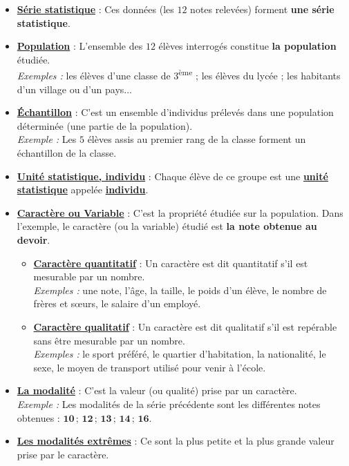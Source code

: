 \documentclass[11pt, a4paper]{article}
\begin{document}
\begin{itemize}
    \item \textbf{\underline{Série statistique}} : Ces données (les $12$ notes relevées) forment \textbf{une série statistique}.
    \item \textbf{\underline{Population}} : L'ensemble des $12$ élèves interrogés constitue \textbf{la population} étudiée. \\
    \textit{Exemples :} les élèves d'une classe de 3\textsuperscript{ème} ; les élèves du lycée ; les habitants d'un village ou d'un pays...
    \item \textbf{\underline{Échantillon}} : C'est un ensemble d'individus prélevés dans une population déterminée (une partie de la population). \\
    \textit{Exemple :} Les $5$ élèves assis au premier rang de la classe forment un échantillon de la classe.
    \item \textbf{\underline{Unité statistique, individu}} : Chaque élève de ce groupe est une \textbf{\underline{unité statistique}} appelée \textbf{\underline{individu}}.
    \item \textbf{\underline{Caractère ou Variable}} : C'est la propriété étudiée sur la population. Dans l'exemple, le caractère (ou la variable) étudié est \textbf{la note obtenue au devoir}.
    \begin{itemize}
        \item \textbf{\underline{Caractère quantitatif}} : Un caractère est dit quantitatif s'il est mesurable par un nombre. \\
        \textit{Exemples :} une note, l'âge, la taille, le poids d'un élève, le nombre de frères et sœurs, le salaire d'un employé.
        \item \textbf{\underline{Caractère qualitatif}} : Un caractère est dit qualitatif s'il est repérable sans être mesurable par un nombre. \\
        \textit{Exemples :} le sport préféré, le quartier d'habitation, la nationalité, le sexe, le moyen de transport utilisé pour venir à l'école.
    \end{itemize}
    \item \textbf{\underline{La modalité}} : C'est la valeur (ou qualité) prise par un caractère. \\
    \textit{Exemple :} Les modalités de la série précédente sont les différentes notes obtenues : $\mathbf{10 \,;\, 12 \,;\, 13 \,;\, 14 \,;\, 16}$.
    \item \textbf{\underline{Les modalités extrêmes}} : Ce sont la plus petite et la plus grande valeur prise par le caractère. \\

\end{itemize}
\end{document}
